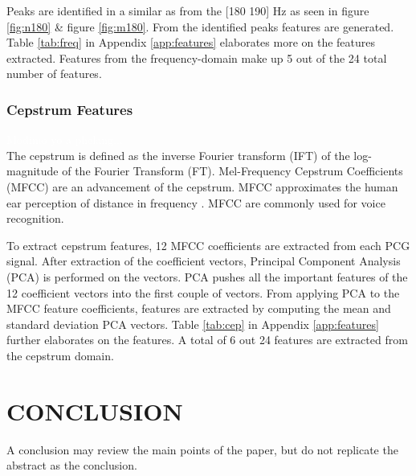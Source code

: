 \documentclass[10pt,twocolumn]{witseiepaper}
\begin{document}
Peaks are identified in a similar as \cite{love} from the [180 190] Hz as seen in figure \ref{fig:n180} \& figure \ref{fig:m180}. From the identified peaks features are generated. Table  \ref{tab:freq} in Appendix \ref{app:features} elaborates more on the features extracted. Features from the frequency-domain make up 5 out of the 24 total number of features.

\subsubsection{Cepstrum Features}
\textcolor{white}{Modimo yo a phelang...}\\
The cepstrum is defined as the inverse Fourier transform (IFT) of the log-magnitude of the Fourier Transform (FT). Mel-Frequency Cepstrum Coefficients (MFCC) are an advancement of the cepstrum. MFCC approximates the human ear perception of distance in frequency \cite{24}. MFCC are commonly used for voice recognition.

To extract cepstrum features, 12 MFCC coefficients are extracted from each PCG signal. After extraction of the coefficient vectors, Principal Component Analysis (PCA)  is performed on the vectors. PCA pushes all the important features of the 12 coefficient vectors into the first couple of vectors. From applying PCA to the MFCC feature coefficients, features are extracted by computing the mean and standard deviation PCA vectors. Table \ref{tab:cep} in Appendix \ref{app:features} further elaborates on the features. A total of 6 out 24 features are extracted from the cepstrum domain.



\newpage
\section{CONCLUSION}

A conclusion may review the main points of the paper, but do not replicate the
abstract as the conclusion.




%




\end{document}
